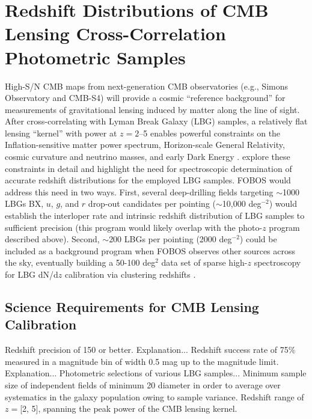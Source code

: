 \documentclass[11pt,a4paper,twoside,onecolumn,openany,final,oldfontcommands]{memoir}
\begin{document}
\section{Redshift Distributions of CMB Lensing Cross-Correlation Photometric Samples}

High-S/N CMB maps from next-generation CMB observatories (e.g., Simons Observatory and CMB-S4) will provide a cosmic ``reference background'' for measurements of gravitational lensing induced by matter along the line of sight.  After cross-correlating with Lyman Break Galaxy (LBG) samples, a relatively flat lensing ``kernel'' with power at $z = 2$--5 enables powerful constraints on the Inflation-sensitive matter power spectrum, Horizon-scale General Relativity, cosmic curvature and neutrino masses, and early Dark Energy \citep{ferraro19}.  \citet{wilson19} explore these constraints in detail and highlight the need for spectroscopic determination of accurate redshift distributions for the employed LBG samples. FOBOS would address this need in two ways.  First, several deep-drilling fields targeting $\sim$1000 LBGs BX, $u$, $g$, and $r$ drop-out candidates per pointing ($\sim$10,000 deg$^{-2}$) would establish the interloper rate and intrinsic redshift distribution of LBG samples to sufficient precision (this program would likely overlap with the photo-$z$ program described above).  Second, $\sim$200 LBGs per pointing (2000 deg$^{-2}$) could be included as a background program when FOBOS observes other sources across the sky, eventually building a 50-100 deg$^2$ data set of sparse high-$z$ spectroscopy for LBG dN/d$z$ calibration via clustering redshifts \citep[see][]{wilson19}. 

\subsection{Science Requirements for CMB Lensing Calibration}

\begin{sciencerequirement}
%
\reqitem Redshift precision of 150 \kms{} or better.  Explanation...
%
\reqitem Redshift success rate of 75\% measured in a magnitude bin of width 0.5 mag up to the magnitude limit.  Explanation...
%
\reqitem Photometric selections of various LBG samples...
%
\reqitem Minimum sample size of 
%
 independent fields of minimum 20\arcmin{} diameter in order to average over systematics in the galaxy population owing to sample variance.
%
\reqitem Redshift range of $z = $[2, 5], spanning the peak power of the CMB lensing kernel.
%
\end{sciencerequirement}
\end{document}
